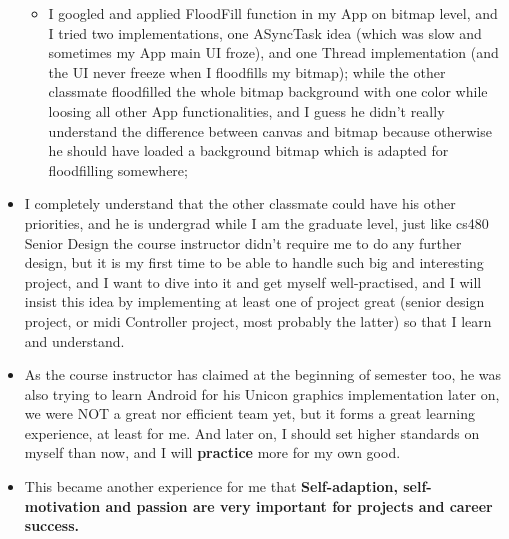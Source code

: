 \documentclass[9pt,b5paper]{article}
\begin{document}
\begin{itemize}
\begin{itemize}
\item I googled and applied FloodFill function in my App on bitmap level, and I tried two implementations, one ASyncTask idea (which was slow and sometimes my App main UI froze), and one Thread implementation (and the UI never freeze when I floodfills my bitmap); while the other classmate floodfilled the whole bitmap background with one color while loosing all other App functionalities, and I guess he didn't really understand the difference between canvas and bitmap because otherwise he should have loaded a background bitmap which is adapted for floodfilling somewhere;
\end{itemize}
\item I completely understand that the other classmate could have his other priorities, and he is undergrad while I am the graduate level, just like cs480 Senior Design the course instructor didn't require me to do any further design, but it is my first time to be able to handle such big and interesting project, and I want to dive into it and get myself well-practised, and I will insist this idea by implementing at least one of project great (senior design project, or midi Controller project, most probably the latter) so that I learn and understand.
\item As the course instructor has claimed at the beginning of semester too, he was also trying to learn Android for his Unicon graphics implementation later on, we were NOT a great nor efficient team yet, but it forms a great learning experience, at least for me. And later on, I should set higher standards on myself than now, and I will \textbf{practice} more for my own good.
\item This became another experience for me that \textbf{Self-adaption, self-motivation and passion are very important for projects and career success.}
\end{itemize}
\end{document}

